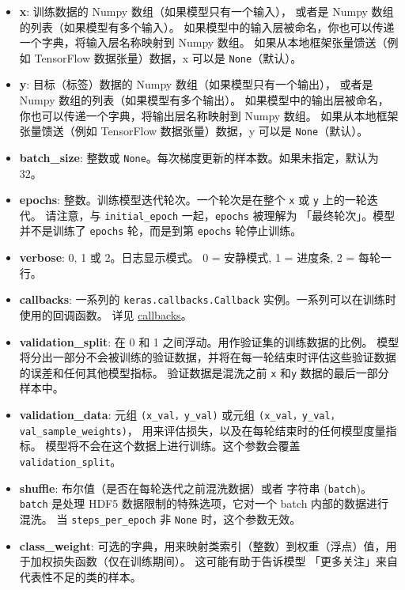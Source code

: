 \begin{itemize}
\tightlist
\item
  \textbf{x}: 训练数据的 Numpy 数组（如果模型只有一个输入）， 或者是
  Numpy 数组的列表（如果模型有多个输入）。
  如果模型中的输入层被命名，你也可以传递一个字典，将输入层名称映射到
  Numpy 数组。 如果从本地框架张量馈送（例如 TensorFlow 数据张量）数据，x
  可以是 \texttt{None}（默认）。
\item
  \textbf{y}: 目标（标签）数据的 Numpy 数组（如果模型只有一个输出），
  或者是 Numpy 数组的列表（如果模型有多个输出）。
  如果模型中的输出层被命名，你也可以传递一个字典，将输出层名称映射到
  Numpy 数组。 如果从本地框架张量馈送（例如 TensorFlow 数据张量）数据，y
  可以是 \texttt{None}（默认）。
\item
  \textbf{batch\_size}: 整数或
  \texttt{None}。每次梯度更新的样本数。如果未指定，默认为 32。
\item
  \textbf{epochs}: 整数。训练模型迭代轮次。一个轮次是在整个 \texttt{x}
  或 \texttt{y} 上的一轮迭代。 请注意，与 \texttt{initial\_epoch}
  一起，\texttt{epochs} 被理解为 「最终轮次」。模型并不是训练了
  \texttt{epochs} 轮，而是到第 \texttt{epochs} 轮停止训练。
\item
  \textbf{verbose}: 0, 1 或 2。日志显示模式。 0 = 安静模式, 1 = 进度条,
  2 = 每轮一行。
\item
  \textbf{callbacks}: 一系列的 \texttt{keras.callbacks.Callback}
  实例。一系列可以在训练时使用的回调函数。 详见
  \hyperref[callbacks]{callbacks}。
\item
  \textbf{validation\_split}: 在 0 和 1
  之间浮动。用作验证集的训练数据的比例。
  模型将分出一部分不会被训练的验证数据，并将在每一轮结束时评估这些验证数据的误差和任何其他模型指标。
  验证数据是混洗之前 \texttt{x} 和\texttt{y} 数据的最后一部分样本中。
\item
  \textbf{validation\_data}: 元组 \texttt{(x\_val，y\_val)} 或元组
  \texttt{(x\_val，y\_val，val\_sample\_weights)}，
  用来评估损失，以及在每轮结束时的任何模型度量指标。
  模型将不会在这个数据上进行训练。这个参数会覆盖
  \texttt{validation\_split}。
\item
  \textbf{shuffle}: 布尔值（是否在每轮迭代之前混洗数据）或者 字符串
  (\texttt{batch})。 \texttt{batch} 是处理 HDF5
  数据限制的特殊选项，它对一个 batch 内部的数据进行混洗。 当
  \texttt{steps\_per\_epoch} 非 \texttt{None} 时，这个参数无效。
\item
  \textbf{class\_weight}:
  可选的字典，用来映射类索引（整数）到权重（浮点）值，用于加权损失函数（仅在训练期间）。
  这可能有助于告诉模型 「更多关注」来自代表性不足的类的样本。

\end{itemize}
